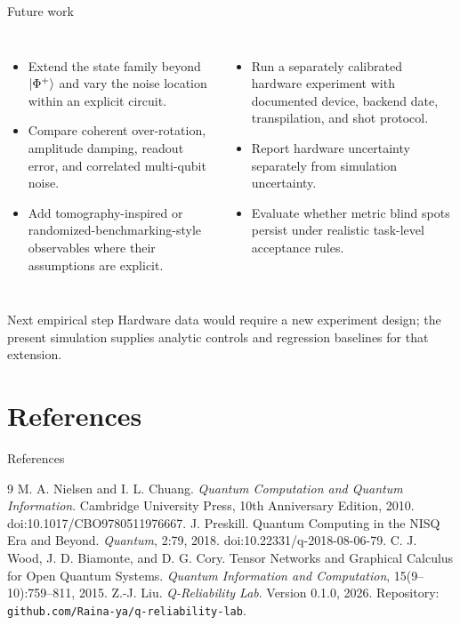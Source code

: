 \documentclass[10pt,aspectratio=169]{beamer}
\newcommand{\sourcefoot}[1]{}
\begin{document}
\begin{frame}[t]{Future work}
\begin{columns}[T]
\begin{itemize}
  \item Extend the state family beyond $\ket{\Phi^+}$ and vary the noise location within an explicit circuit.
  \item Compare coherent over-rotation, amplitude damping, readout error, and correlated multi-qubit noise.
  \item Add tomography-inspired or randomized-benchmarking-style observables where their assumptions are explicit.
\end{itemize}
\begin{itemize}
  \item Run a separately calibrated hardware experiment with documented device, backend date, transpilation, and shot protocol.
  \item Report hardware uncertainty separately from simulation uncertainty.
  \item Evaluate whether metric blind spots persist under realistic task-level acceptance rules.
\end{itemize}
\end{columns}
\begin{block}{Next empirical step}
Hardware data would require a new experiment design; the present simulation supplies analytic controls and regression baselines for that extension.
\end{block}
\sourcefoot{Proposed extensions, not results of the current study.}
\end{frame}

\section{References}
\begin{frame}[t]{References}
\small
\begin{thebibliography}{9}
 M. A. Nielsen and I. L. Chuang. \emph{Quantum Computation and Quantum Information}. Cambridge University Press, 10th Anniversary Edition, 2010. doi:10.1017/CBO9780511976667.
\vspace{2mm}
 J. Preskill. Quantum Computing in the NISQ Era and Beyond. \emph{Quantum}, 2:79, 2018. doi:10.22331/q-2018-08-06-79.
\vspace{2mm}
 C. J. Wood, J. D. Biamonte, and D. G. Cory. Tensor Networks and Graphical Calculus for Open Quantum Systems. \emph{Quantum Information and Computation}, 15(9--10):759--811, 2015.
\vspace{2mm}
 Z.-J. Liu. \emph{Q-Reliability Lab}. Version 0.1.0, 2026. Repository: \texttt{github.com/Raina-ya/q-reliability-lab}.
\end{thebibliography}
\sourcefoot{Bibliographic entries match \texttt{paper/references.bib} and \texttt{CITATION.cff}.}
\end{frame}
\end{document}
